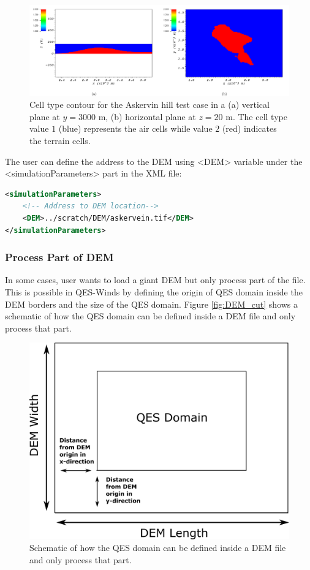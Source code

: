\begin{figure}[h]
    \centering
    \includegraphics[width=\textwidth]{Images/askervein.pdf}
    \caption{Cell type contour for the Askervin hill test case in a (a) vertical plane at $y=3000$ m, (b) horizontal plane at $z=20$ m. The cell type value $1$ (blue) represents the air cells while value $2$ (red) indicates the terrain cells.}
\end{figure}

The user can define the address to the DEM using <DEM> variable under the <simulationParameters> part in the XML file:

\begin{lstlisting}[language=XML]
<simulationParameters>
	<!-- Address to DEM location-->
	<DEM>../scratch/DEM/askervein.tif</DEM>				
</simulationParameters>
\end{lstlisting}

\subsubsection{Process Part of DEM}

In some cases, user wants to load a giant DEM but only process part of the file. This is possible in QES-Winds by defining the origin of QES domain inside the DEM borders and the size of the QES domain. Figure \ref{fig:DEM_cut} shows a schematic of how the QES domain can be defined inside a DEM file and only process that part.

\begin{figure}[h!]
\centering
\includegraphics[width=13.0cm,keepaspectratio]{Images/DEM_cut.png}
\caption{Schematic of how the QES domain can be defined inside a DEM file and only process that part. }
\end{figure}

